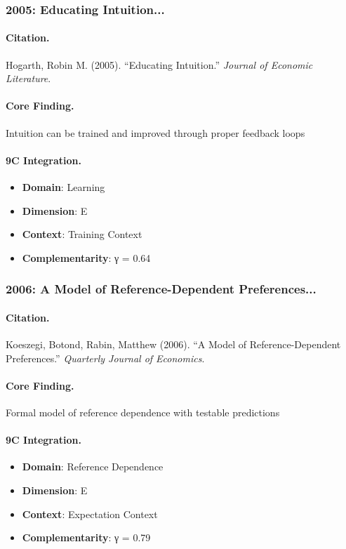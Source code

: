 \subsubsection{2005: Educating Intuition...}

\paragraph{Citation.}
Hogarth, Robin M. (2005). ``Educating Intuition.''
\textit{Journal of Economic Literature}.

\paragraph{Core Finding.}
Intuition can be trained and improved through proper feedback loops

\paragraph{9C Integration.}
\begin{itemize}[nosep]
  \item \textbf{Domain}: Learning
  \item \textbf{Dimension}: E
  \item \textbf{Context}: Training Context
  \item \textbf{Complementarity}: γ = 0.64
\end{itemize}

\subsubsection{2006: A Model of Reference-Dependent Preferences...}

\paragraph{Citation.}
Koeszegi, Botond, Rabin, Matthew (2006). ``A Model of Reference-Dependent Preferences.''
\textit{Quarterly Journal of Economics}.

\paragraph{Core Finding.}
Formal model of reference dependence with testable predictions

\paragraph{9C Integration.}
\begin{itemize}[nosep]
  \item \textbf{Domain}: Reference Dependence
  \item \textbf{Dimension}: E
  \item \textbf{Context}: Expectation Context
  \item \textbf{Complementarity}: γ = 0.79
\end{itemize}

